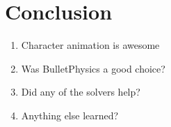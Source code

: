 
\section{Conclusion}
\label{sec:Conclusion}

\begin{enumerate}
	\item Character animation is awesome
	\item Was BulletPhysics a good choice?
	\item Did any of the solvers help?
	\item Anything else learned?
\end{enumerate}